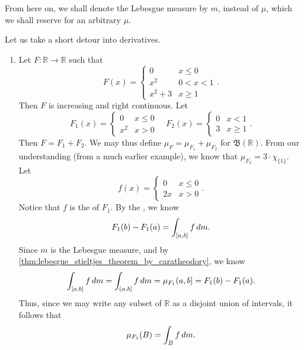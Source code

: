 \documentclass[notoc,notitlepage]{tufte-book}
\begin{document}
\begin{note}
  From here on, we shall denote the Lebesgue measure by $m$, instead
  of $\mu$, which we shall reserve for an arbitrary $\mu$.
\end{note}

Let us take a short detour into derivatives.

\begin{eg}
  \begin{enumerate}
    \item Let $F : \mathbb{R} \to \mathbb{R}$ such that
      \begin{equation*}
        F(x) = \begin{cases}
          0       & x \leq 0 \\
          x^2     & 0 < x < 1 \\
          x^2 + 3 & x \geq 1
        \end{cases}.
      \end{equation*}
      Then $F$ is increasing and right continuous. Let
      \begin{equation*}
        F_1(x) = \begin{cases}
          0   & x \leq 0 \\
          x^2 & x > 0
        \end{cases} \quad
        F_2(x) = \begin{cases}
          0 & x < 1 \\
          3 & x \geq 1
        \end{cases}.
      \end{equation*}
      Then $F = F_1 + F_2$.
      We may thus define $\mu_F = \mu_{F_1} + \mu_{F_2}$ for
      $\mathfrak{B}(\mathbb{R})$.
      From our understanding (from a much earlier example),
      we know that $\mu_{F_2} = 3 \cdot \chi_{\{1\}}$.
      Let 
      \begin{equation*}
        f(x) = \begin{cases}
          0 & x \leq 0 \\
          2x & x > 0
        \end{cases}.
      \end{equation*}
      Notice that $f$ is the  of $F_1$.
      By the
      ,
      we know
      \begin{equation*}
        F_1(b) - F_1(a) = \int_{[a, b]} f \mathop{}\!d{m}.
      \end{equation*}
      Since $m$ is the Lebesgue measure, and by
      \cref{thm:lebesgue_stieltjes_theorem_by_caratheodory}, we know
      \begin{equation*}
        \int_{[a, b]} f \mathop{}\!d{m} = \int_{(a, b]} f \mathop{}\!d{m}
              = \mu_{F_1}(a, b] = F_1(b) - F_1(a).
      \end{equation*}
      Thus, since we may write any subset of $\mathbb{R}$ as a disjoint
      union of intervals, it follows that
      \begin{equation*}
        \mu_{F_1}(B) = \int_{B} f \mathop{}\!d{m}.
      \end{equation*}
      

\end{enumerate}
\end{eg}
\end{document}
